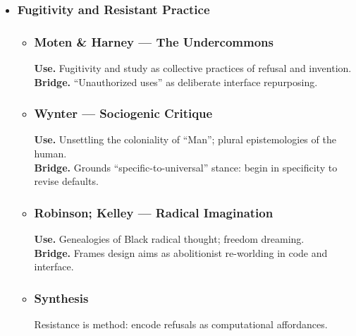 \begin{itemize}[nosep]
\begin{itemize}[nosep]
		\textbf{Use.} Speculative method to address archival silences ethically. \\
		\textbf{Bridge.} Guides documentation and naming practices for culturally grounded tools.
		\item \subsubsection{Synthesis} Speculation becomes design requirement when tied to sonic logics and tool modification.
	\end{itemize}
	\item \subsubsection{Fugitivity and Resistant Practice}
	\begin{itemize}[nosep]
		\item \subsubsection{Moten \& Harney — The Undercommons}
		\textbf{Use.} Fugitivity and study as collective practices of refusal and invention. \\
		\textbf{Bridge.} “Unauthorized uses” as deliberate interface repurposing.
		\item \subsubsection{Wynter — Sociogenic Critique}
		\textbf{Use.} Unsettling the coloniality of “Man”; plural epistemologies of the human. \\
		\textbf{Bridge.} Grounds “specific-to-universal” stance: begin in specificity to revise defaults.
		\item \subsubsection{Robinson; Kelley — Radical Imagination}
		\textbf{Use.} Genealogies of Black radical thought; freedom dreaming. \\
		\textbf{Bridge.} Frames design aims as abolitionist re-worlding in code and interface.
		\item \subsubsection{Synthesis} Resistance is method: encode refusals as computational affordances.

\end{itemize}
\end{itemize}
